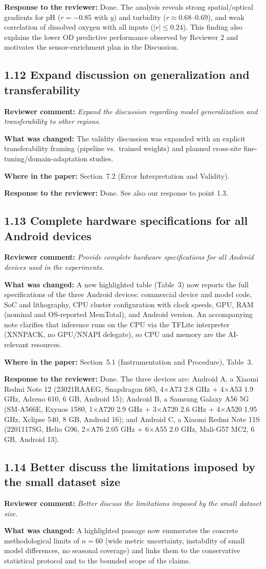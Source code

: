 \documentclass[11pt,a4paper]{article}
\newcommand{\comment}[1]{\textbf{Reviewer comment:} \textit{#1}}
\newcommand{\change}[1]{\textbf{What was changed:} #1}
\newcommand{\where}[1]{\textbf{Where in the paper:} #1}
\newcommand{\resp}[1]{\textbf{Response to the reviewer:} \textcolor{revblue}{#1}}
\newcommand{\pt}[1]{\subsection*{#1}}
\begin{document}
\resp{Done. The analysis reveals strong spatial/optical gradients for pH ($r=-0.85$ with $y$) and turbidity ($r\approx 0.68$--$0.69$), and weak correlation of dissolved oxygen with all inputs ($|r| \leq 0.24$). This finding also explains the lower OD predictive performance observed by Reviewer 2 and motivates the sensor-enrichment plan in the Discussion.}

\pt{1.12 Expand discussion on generalization and transferability}
\comment{Expand the discussion regarding model generalization and transferability to other regions.}

\change{The validity discussion was expanded with an explicit transferability framing (pipeline vs.\ trained weights) and planned cross-site fine-tuning/domain-adaptation studies.}

\where{Section~7.2 (Error Interpretation and Validity).}

\resp{Done. See also our response to point 1.3.}

\pt{1.13 Complete hardware specifications for all Android devices}
\comment{Provide complete hardware specifications for all Android devices used in the experiments.}

\change{A new highlighted table (Table~3) now reports the full specifications of the three Android devices: commercial device and model code, SoC and lithography, CPU cluster configuration with clock speeds, GPU, RAM (nominal and OS-reported MemTotal), and Android version. An accompanying note clarifies that inference runs on the CPU via the TFLite interpreter (XNNPACK, no GPU/NNAPI delegate), so CPU and memory are the AI-relevant resources.}

\where{Section~5.1 (Instrumentation and Procedure), Table~3.}

\resp{Done. The three devices are: Android A, a Xiaomi Redmi Note 12 (23021RAAEG, Snapdragon 685, 4$\times$A73 2.8 GHz + 4$\times$A53 1.9 GHz, Adreno 610, 6 GB, Android 15); Android B, a Samsung Galaxy A56 5G (SM-A566E, Exynos 1580, 1$\times$A720 2.9 GHz + 3$\times$A720 2.6 GHz + 4$\times$A520 1.95 GHz, Xclipse 540, 8 GB, Android 16); and Android C, a Xiaomi Redmi Note 11S (2201117SG, Helio G96, 2$\times$A76 2.05 GHz + 6$\times$A55 2.0 GHz, Mali-G57 MC2, 6 GB, Android 13).}

\pt{1.14 Better discuss the limitations imposed by the small dataset size}
\comment{Better discuss the limitations imposed by the small dataset size.}

\change{A highlighted passage now enumerates the concrete methodological limits of $n=60$ (wide metric uncertainty, instability of small model differences, no seasonal coverage) and links them to the conservative statistical protocol and to the bounded scope of the claims.}
\end{document}
